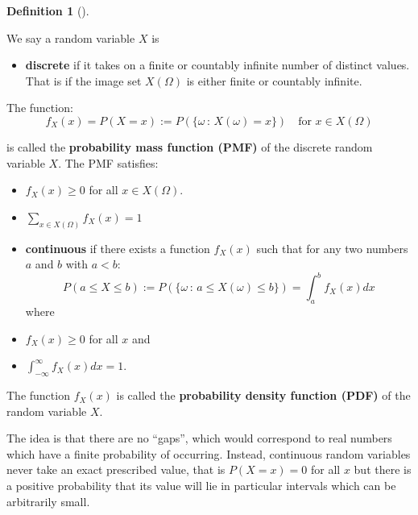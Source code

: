 \documentclass[
  letterpaper,
  DIV=11,
  numbers=noendperiod]{scrreport}
\providecommand{\tightlist}{%
  \setlength{\itemsep}{0pt}\setlength{\parskip}{0pt}}
\theoremstyle{definition}
\theoremstyle{plain}
\theoremstyle{definition}
\newtheorem{definition}{Definition}[chapter]
\theoremstyle{plain}
\theoremstyle{remark}
\begin{document}
\begin{tcolorbox}[enhanced jigsaw, breakable, opacityback=0, leftrule=.75mm, colback=white, bottomtitle=1mm, coltitle=black, toptitle=1mm, titlerule=0mm, bottomrule=.15mm, colframe=quarto-callout-note-color-frame, title={Discrete and continuous random variables}, opacitybacktitle=0.6, colbacktitle=quarto-callout-note-color!10!white, rightrule=.15mm, arc=.35mm, toprule=.15mm, left=2mm]

\begin{definition}[]\protect\hypertarget{def-discrete-continuous-random-variable}{}\label{def-discrete-continuous-random-variable}

We say a random variable \(X\) is

\begin{itemize}
\tightlist
\item
  \textbf{discrete} if it takes on a finite or countably infinite number
  of distinct values. That is if the image set \(X(\Omega)\) is either
  finite or countably infinite.
\end{itemize}

The function: \[
f_X(x) = P(X=x):=P(\{\omega\,:\,X(\omega)=x\})\quad  \mbox{for } x\in X(\Omega)
\]

is called the \textbf{probability mass function (PMF)} of the discrete
random variable \(X\). The PMF satisfies:

\begin{itemize}
\item
  \(f_X(x) \ge 0\) for all \(x \in X(\Omega)\).
\item
  \(\sum_{x \in X(\Omega)} f_X(x) = 1\)
\item
  \textbf{continuous} if there exists a function \(f_X(x)\) such that
  for any two numbers \(a\) and \(b\) with \(a < b\):
  \[ P(a \le X \le b):=P(\{\omega\,:\, a \leq X(\omega)\leq b\}) = \int_a^b f_X(x) dx \]
  where
\item
  \(f_X(x) \ge 0\) for all \(x\) and
\item
  \(\int_{-\infty}^{\infty} f_X(x) dx = 1\).
\end{itemize}

The function \(f_X(x)\) is called the \textbf{probability density
function (PDF)} of the random variable \(X\).

\end{definition}

\end{tcolorbox}

The idea is that there are no ``gaps'', which would correspond to real
numbers which have a finite probability of occurring. Instead,
continuous random variables never take an exact prescribed value, that
is \(P(X=x)=0\) for all \(x\) but there is a positive probability that
its value will lie in particular intervals which can be arbitrarily
small.
\end{document}

